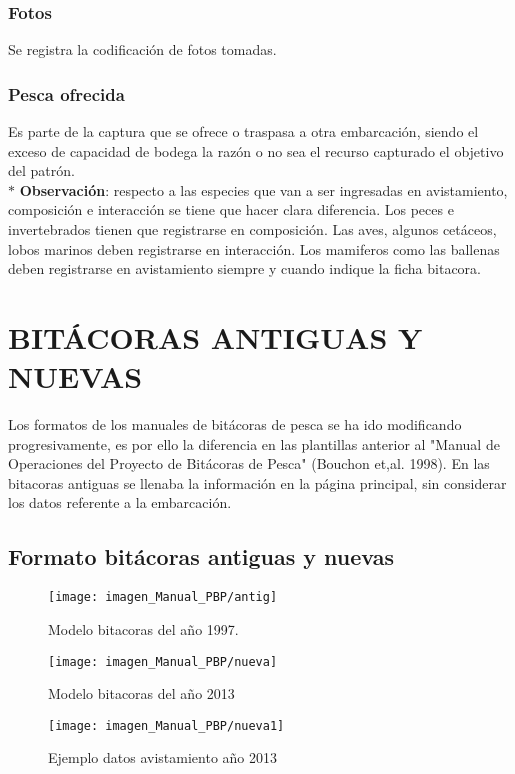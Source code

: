 \documentclass[a4paper,oneside,11pt]{book}
\begin{document}
\subsection{Fotos} Se registra la codificación de fotos tomadas.

\subsection{Pesca ofrecida} Es parte de la captura que se ofrece o traspasa a otra embarcación, siendo el exceso de capacidad de bodega la razón o no sea el recurso capturado el objetivo del patrón.\\

$\ast$ \textbf{Observación}: respecto a las especies que van a ser ingresadas en avistamiento, composición e interacción se tiene que hacer clara diferencia. Los peces e invertebrados tienen que registrarse en composición. Las aves, algunos cetáceos, lobos marinos deben registrarse en interacción. Los mamiferos como las ballenas deben registrarse en avistamiento siempre y cuando indique la ficha bitacora.


\chapter{ BITÁCORAS ANTIGUAS Y NUEVAS}
Los formatos de los manuales de bitácoras de pesca se ha ido modificando progresivamente, es  por ello la diferencia en las plantillas anterior al "Manual de Operaciones del Proyecto de Bitácoras de Pesca" (Bouchon et,al. 1998). En las bitacoras antiguas se llenaba la información en la página principal, sin considerar los datos referente a la embarcación.

\section{Formato bitácoras antiguas y nuevas}



\begin{figure}
\centering
\texttt{[image: imagen\_Manual\_PBP/antig]}
\caption{Modelo bitacoras del año 1997.}
\label{fig:inter}
\end{figure}
\begin{figure}
\centering
\texttt{[image: imagen\_Manual\_PBP/nueva]}
\caption{Modelo bitacoras del año 2013}
\label{fig:inter}
\end{figure}

\begin{figure}
\centering
\texttt{[image: imagen\_Manual\_PBP/nueva1]}
\caption{Ejemplo datos avistamiento año 2013}
\label{fig:inter}
\end{figure}
 
\end{document}
